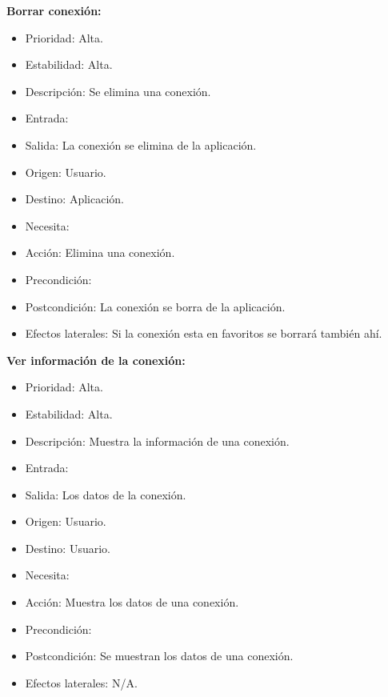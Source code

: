 \textbf{Borrar conexión:}
\begin{itemize}
\item Prioridad: Alta.
\item Estabilidad: Alta.
\item Descripción: Se elimina una conexión.
\item Entrada:
\item Salida: La conexión se elimina de la aplicación.
\item Origen: Usuario.
\item Destino: Aplicación.
\item Necesita:
\item Acción: Elimina una conexión.
\item Precondición:
\item Postcondición: La conexión se borra de la aplicación.
\item Efectos laterales: Si la conexión esta en favoritos se borrará también ahí.\\

\end{itemize}

\textbf{Ver información de la conexión:}
\begin{itemize}
\item Prioridad: Alta.
\item Estabilidad: Alta.
\item Descripción: Muestra la información de una conexión.
\item Entrada:
\item Salida: Los datos de la conexión.
\item Origen: Usuario.
\item Destino: Usuario.
\item Necesita:
\item Acción: Muestra los datos de una conexión.
\item Precondición:
\item Postcondición: Se muestran los datos de una conexión.
\item Efectos laterales: N/A.\\

\end{itemize}

